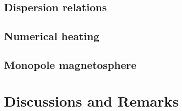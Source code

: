 \subsection{Dispersion relations}
\label{sec:test-dispersion}

\subsection{Numerical heating}
\label{sec:test-heating}

\subsection{Monopole magnetosphere}
\label{sec:test-monopole}





\section{Discussions and Remarks}
\label{sec:code-discussions}

